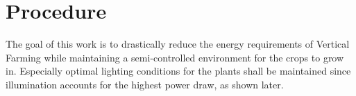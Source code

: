 







\section{Procedure}
The goal of this work is to drastically reduce the energy requirements of Vertical Farming while maintaining a semi-controlled environment for the crops to grow in.
Especially optimal lighting conditions for the plants shall be maintained since illumination accounts for the highest power draw, as shown later.

